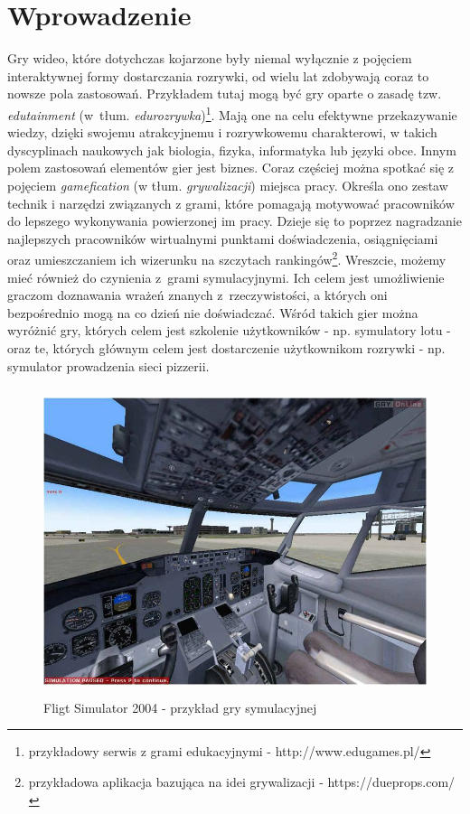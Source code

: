 \chapter*{Wprowadzenie}
Gry wideo, które dotychczas kojarzone były niemal wyłącznie z pojęciem interaktywnej formy dostarczania rozrywki, od wielu lat zdobywają coraz to nowsze pola zastosowań. Przykładem tutaj mogą być gry oparte o zasadę tzw. \emph{edutainment} (w~tłum. \emph{edurozrywka})\footnote{przykładowy serwis z grami edukacyjnymi - http://www.edugames.pl/}. Mają one na celu efektywne przekazywanie wiedzy, dzięki swojemu atrakcyjnemu i rozrywkowemu charakterowi, w takich dyscyplinach naukowych jak biologia, fizyka, informatyka lub języki obce. 
Innym polem zastosowań elementów gier jest biznes. Coraz częściej można spotkać się z pojęciem \emph{gamefication} (w tłum. \emph{grywalizacji}) miejsca pracy. Określa ono zestaw technik i narzędzi związanych z grami, które pomagają motywować pracowników do lepszego wykonywania powierzonej im pracy. Dzieje się to poprzez nagradzanie najlepszych pracowników wirtualnymi punktami doświadczenia, osiągnięciami oraz umieszczaniem ich wizerunku na szczytach rankingów\footnote{przykładowa aplikacja bazująca na idei grywalizacji - https://dueprops.com/}.
Wreszcie, możemy mieć również do czynienia z~grami symulacyjnymi. Ich celem jest umożliwienie graczom doznawania wrażeń znanych z~rzeczywistości, a których oni bezpośrednio mogą na co dzień nie doświadczać. Wśród takich gier można wyróżnić gry, których celem jest szkolenie użytkowników - np. symulatory lotu - oraz te, których głównym celem jest dostarczenie użytkownikom rozrywki - np. symulator prowadzenia sieci pizzerii.

\begin{figure}
\begin{center}
	\includegraphics[width=120mm,height=90mm]{images/flightSim}
	\caption{Fligt Simulator 2004 - przykład gry symulacyjnej}
\end{center}
\end{figure}

